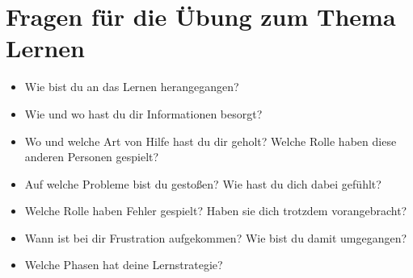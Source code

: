 \section{Fragen für die Übung zum Thema Lernen}
\begin{itemize}
 \item Wie bist du an das Lernen herangegangen?
 \item Wie und wo hast du dir Informationen besorgt?
 \item Wo und welche Art von Hilfe hast du dir geholt? Welche Rolle haben diese anderen Personen gespielt?
 \item Auf welche Probleme bist du gestoßen? Wie hast du dich dabei gefühlt?
 \item Welche Rolle haben Fehler gespielt? Haben sie dich trotzdem vorangebracht?
 \item Wann ist bei dir Frustration aufgekommen? Wie bist du damit umgegangen?
 \item Welche Phasen hat deine Lernstrategie?
\end{itemize}
